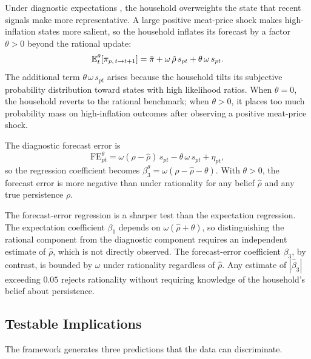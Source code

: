 Under diagnostic expectations \citep{Bordalo2018}, the household
overweights the state that recent signals make more
representative.
A large positive meat-price shock makes high-inflation states
more salient, so the household inflates its forecast by a factor
$\theta > 0$ beyond the rational update:
\begin{equation}\label{eq:diagnostic_forecast}
  \mathbb{E}_t^{\theta}[\pi_{p,\,t \to t+1}]
  = \bar{\pi}
    + \omega\,\hat{\rho}\,s_{pt}
    + \theta\,\omega\,s_{pt}.
\end{equation}
The additional term $\theta\,\omega\,s_{pt}$ arises because
the household tilts its subjective probability distribution
toward states with high likelihood ratios.
When $\theta = 0$, the household reverts to the rational
benchmark; when $\theta > 0$, it places too much probability
mass on high-inflation outcomes after observing a positive
meat-price shock.

The diagnostic forecast error is
\begin{equation}\label{eq:diagnostic_fe}
  \mathrm{FE}^{\theta}_{pt}
  = \omega(\rho - \hat{\rho})\,s_{pt}
    - \theta\,\omega\,s_{pt}
    + \eta_{pt},
\end{equation}
so the regression coefficient becomes
$\beta_3^{\theta} = \omega(\rho - \hat{\rho} - \theta)$.
With $\theta > 0$, the forecast error is more negative than under
rationality for any belief $\hat{\rho}$ and any true persistence
$\rho$.

The forecast-error regression is a sharper test than the
expectation regression.
The expectation coefficient $\beta_1$ depends on
$\omega(\hat{\rho} + \theta)$, so distinguishing the rational
component from the diagnostic component requires an independent
estimate of $\hat{\rho}$, which is not directly observed.
The forecast-error coefficient $\beta_3$, by contrast, is
bounded by $\omega$ under rationality regardless of
$\hat{\rho}$.
Any estimate of $|\hat{\beta}_3|$ exceeding $0.05$ rejects
rationality without requiring knowledge of the household's
belief about persistence.

\subsection{Testable Implications}\label{sec:testable}

The framework generates three predictions that the data can
discriminate.

